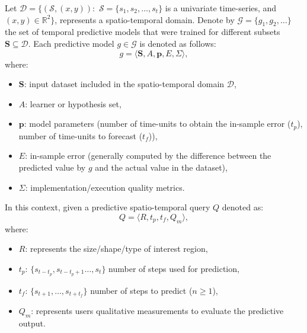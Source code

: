Let $\mathcal{D} = \{(\mathcal{S},( x, y)): \,\, \mathcal{S} = \{s_{1}, s_{2}, \ldots, s_{t}\}$ is a univariate time-series, and $(x,y) \in \mathbb{R}^{2}\}$, represents a spatio-temporal domain. Denote by $\mathcal{G} = \{g_{1}, g_{2}, \ldots \}$ the set of temporal predictive models that were trained for different subsets $\mathbf{S} \subseteq \mathcal{D}$. Each predictive model $g\in \mathcal{G}$ is denoted as follows:
\begin{equation}
\label{eq:ModelDefinition}
g = \langle \mathbf{S}, A, \mathbf{p}, E, \varSigma \rangle,
\end{equation}
where:
\begin{itemize}[noitemsep,nolistsep]	
	\item $\mathbf{S}$: input dataset included in the spatio-temporal domain $\mathcal{D}$,
	\item $A$: learner or hypothesis set,
	\item $\mathbf{p}$: model parameters (number of time-units to obtain the in-sample error ($t_{p}$), number of time-units to forecast ($t_{f}$)),
	\item $E$: in-sample error (generally computed by the difference between the predicted value by $g$ and the actual value in the dataset),
	\item $\varSigma$: implementation/execution quality metrics.
\end{itemize}

In this context, given a predictive spatio-temporal query $Q$ denoted as:
\begin{equation} \label{eq:predictivequery}
Q = \langle R, t_{p}, t_{f}, Q_{m} \rangle,
\end{equation}
where:
\begin{itemize}[noitemsep,nolistsep]	
	\item $R$: represents the size/shape/type of interest region,
	\item $t_{p}$: $\{s_{t-t_p}, s_{t-t_{p}+1}\ldots, s_{t}\}$ number of steps used for  prediction,
	\item $t_{f}$: $\{s_{t+1}, \ldots, s_{t+t_f}\}$ number of steps to predict ($n\geq 1$),
	\item $Q_{m}$: represents users qualitative measurements to evaluate the predictive output.
\end{itemize}

